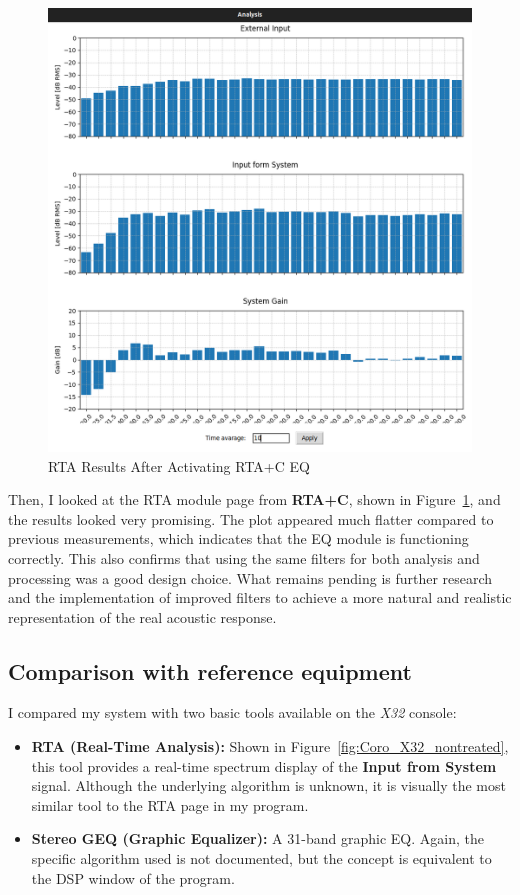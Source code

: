 \begin{figure}[H]
	\centering
	\includegraphics[width=0.8
	\linewidth]{Figures/Coro_RTA+EQ_ON.png}
	\caption{RTA Results After Activating RTA+C EQ}
	\label{fig:Coro_RTA_RTA+C}
\end{figure}

Then, I looked at the RTA module page from \textbf{RTA+C}, shown in Figure~\ref{fig:Coro_RTA_RTA+C}, and the results looked very promising. The plot appeared much flatter compared to previous measurements, which indicates that the EQ module is functioning correctly. This also confirms that using the same filters for both analysis and processing was a good design choice. What remains pending is further research and the implementation of improved filters to achieve a more natural and realistic representation of the real acoustic response.

\subsection{Comparison with reference equipment}

I compared my system with two basic tools available on the \textit{X32} console:

\begin{itemize}
	\item \textbf{RTA (Real-Time Analysis):} Shown in Figure~\ref{fig:Coro_X32_nontreated}, this tool provides a real-time spectrum display of the \textbf{Input from System} signal. Although the underlying algorithm is unknown, it is visually the most similar tool to the RTA page in my program.
	\item \textbf{Stereo GEQ (Graphic Equalizer):} A 31-band graphic EQ. Again, the specific algorithm used is not documented, but the concept is equivalent to the DSP window of the program.
\end{itemize}

